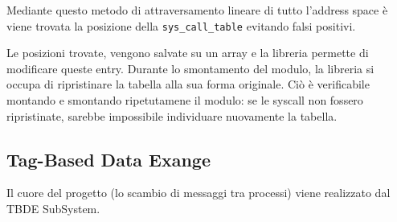 Mediante questo metodo di attraversamento lineare di tutto l'address space è viene trovata la
posizione della \verb|sys_call_table| evitando falsi positivi.

Le posizioni trovate, vengono salvate su un array e la libreria permette di modificare queste entry.
Durante lo smontamento del modulo, la libreria si occupa di ripristinare la tabella alla sua forma originale.
Ciò è verificabile montando e smontando ripetutamene il modulo: se le syscall non fossero ripristinate, sarebbe
impossibile individuare nuovamente la tabella.
\newpage


\subsection{Tag-Based Data Exange} \label{tbde}

Il cuore del progetto (lo scambio di messaggi tra processi) viene realizzato dal TBDE SubSystem.

